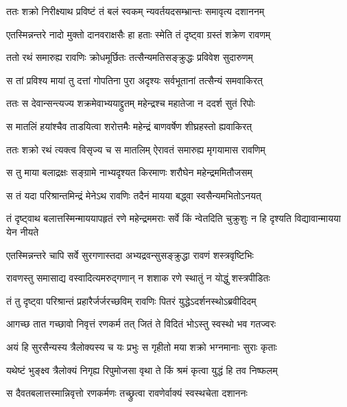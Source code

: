\twolineshloka
{ततः शक्रो निरीक्ष्याथ प्रविष्टं तं बलं स्वकम्}
{न्यवर्तयदसम्भ्रान्तः समावृत्य दशाननम्} %

\twolineshloka
{एतस्मिन्नन्तरे नादो मुक्तो दानवराक्षसैः}
{हा हताः स्मेति तं दृष्ट्वा ग्रस्तं शक्रेण रावणम्} %

\twolineshloka
{ततो रथं समारुह्य रावणिः क्रोधमूर्छितः}
{तत्सैन्यमतिसङ्क्रुद्धः प्रविवेश सुदारुणम्} %

\twolineshloka
{स तां प्रविश्य मायां तु दत्तां गोपतिना पुरा}
{अदृश्यः सर्वभूतानां तत्सैन्यं समवाकिरत्} %

\twolineshloka
{ततः स देवान्सन्त्यज्य शक्रमेवाभ्ययाद्द्रुतम्}
{महेन्द्रश्च महातेजा न ददर्श सुतं रिपोः} %

\twolineshloka
{स मातलिं हयांश्चैव ताडयित्वा शरोत्तमैः}
{महेन्द्रं बाणवर्षेण शीघ्रहस्तो ह्यवाकिरत्} %

\twolineshloka
{ततः शक्रो रथं त्यक्त्व विसृज्य च स मातलिम्}
{ऐरावतं समारुह्य मृगयामास रावणिम्} %

\twolineshloka
{स तु माया बलाद्रक्षः सङ्ग्रामे नाभ्यदृश्यत}
{किरमाणः शरौघेन महेन्द्रममितौजसम्} %

\twolineshloka
{स तं यदा परिश्रान्तमिन्द्रं मेनेऽथ रावणिः}
{तदैनं मायया बद्ध्वा स्वसैन्यमभितोऽनयत्} %

\threelineshloka
{तं दृष्ट्वाथ बलात्तस्मिन्माययापहृतं रणे}
{महेन्द्रममराः सर्वे किं न्वेतदिति चुक्रुशुः}
{न हि दृश्यति विद्यावान्मायया येन नीयते} %

\twolineshloka
{एतस्मिन्नन्तरे चापि सर्वे सुरगणास्तदा}
{अभ्यद्रवन्सुसङ्क्रुद्धा रावणं शस्त्रवृष्टिभिः} %

\twolineshloka
{रावणस्तु समासाद्य वस्वादित्यमरुद्गणान्}
{न शशाक रणे स्थातुं न योद्धुं शस्त्रपीडितः} %

\twolineshloka
{तं तु दृष्ट्वा परिश्रान्तं प्रहारैर्जर्जरच्छविम्}
{रावणिः पितरं युद्धेऽदर्शनस्थोऽब्रवीदिदम्} %

\twolineshloka
{आगच्छ तात गच्छावो निवृत्तं रणकर्म तत्}
{जितं ते विदितं भोऽस्तु स्वस्थो भव गतज्वरः} %

\twolineshloka
{अयं हि सुरसैन्यस्य त्रैलोक्यस्य च यः प्रभुः}
{स गृहीतो मया शक्रो भग्नमानाः सुराः कृताः} %

\twolineshloka
{यथेष्टं भुङ्क्ष्व त्रैलोक्यं निगृह्य रिपुमोजसा}
{वृथा ते किं श्रमं कृत्वा युद्धं हि तव निष्फलम्} %

\twolineshloka
{स दैवतबलात्तस्मान्निवृत्तो रणकर्मणः}
{तच्छ्रुत्वा रावणेर्वाक्यं स्वस्थचेता दशाननः} %

